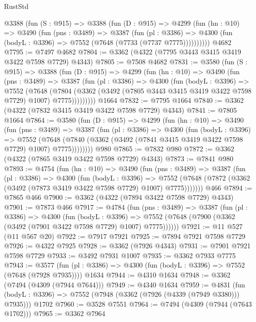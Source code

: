 \begin{lexlean}{RustStd}
\begin{coremodule}
    @3388
      (fun (S : @915) =>
      @3388
        (fun (D : @915) =>
        @4299
          (fun (hn : @10) =>
          @3490
            (fun (pns : @3489) =>
            @3387
              (fun (pl : @3386) =>
              @4300 (fun (bodyL : @3396) => @7552 (@7648 (@7733 (@7737 @7775))))))))))
    @4682
@7795 := @7497 @4682
@7804 := @3362 (@4322 (@7795 @3443 @3415 @3419 @3422 @7598 @7729) @4343)
@7805 := @7508 @4682
@7831 := @3580
    (fun (S : @915) =>
    @3388
      (fun (D : @915) =>
      @4299
        (fun (hn : @10) =>
        @3490
          (fun (pns : @3489) =>
          @3387
            (fun (pl : @3386) =>
            @4300
              (fun (bodyL : @3396) =>
              @7552
                (@7648
                  (@7804
                    (@3362 (@3492 (@7805 @3443 @3415 @3419 @3422 @7598 @7729) @1007) @7775)))))))))
    @1664
@7832 := @7795 @1664
@7840 := @3362 (@4322 (@7832 @3415 @3419 @3422 @7598 @7729) @4343)
@7841 := @7805 @1664
@7864 := @3580
    (fun (D : @915) =>
    @4299
      (fun (hn : @10) =>
      @3490
        (fun (pns : @3489) =>
        @3387
          (fun (pl : @3386) =>
          @4300
            (fun (bodyL : @3396) =>
            @7552
              (@7648 (@7840 (@3362 (@3492 (@7841 @3415 @3419 @3422 @7598 @7729) @1007) @7775))))))))
    @980
@7865 := @7832 @980
@7872 := @3362 (@4322 (@7865 @3419 @3422 @7598 @7729) @4343)
@7873 := @7841 @980
@7893 := @4754
    (fun (hn : @10) =>
    @3490
      (fun (pns : @3489) =>
      @3387
        (fun (pl : @3386) =>
        @4300
          (fun (bodyL : @3396) =>
          @7552 (@7648 (@7872 (@3362 (@3492 (@7873 @3419 @3422 @7598 @7729) @1007) @7775)))))))
    @466
@7894 := @7865 @466
@7900 := @3362 (@4322 (@7894 @3422 @7598 @7729) @4343)
@7901 := @7873 @466
@7917 := @4784
    (fun (pns : @3489) =>
    @3387
      (fun (pl : @3386) =>
      @4300
        (fun (bodyL : @3396) =>
        @7552 (@7648 (@7900 (@3362 (@3492 (@7901 @3422 @7598 @7729) @1007) @7775))))))
@7921 := @11 @527 (@11 @567 @20)
@7922 := @7917 @7921
@7925 := @7894 @7921 @7598 @7729
@7926 := @4322 @7925
@7928 := @3362 (@7926 @4343)
@7931 := @7901 @7921 @7598 @7729
@7933 := @3492 @7931 @1007
@7935 := @3362 @7933 @7775
@7943 := @3577
    (fun (pl : @3386) => @4300 (fun (bodyL : @3396) => @7552 (@7648 (@7928 @7935))))
    @1634
@7944 := @4310 @1634
@7948 := @3362 (@7494 (@4309 (@7944 @7644)))
@7949 := @4340 @1634
@7959 := @4831
    (fun (bodyL : @3396) => @7552 (@7948 (@3362 (@7926 (@4339 (@7949 @3380))) @7935)))
    @1702
@7960 := @3528 @7551
@7964 := @7494 (@4309 (@7944 (@7643 @1702)))
@7965 := @3362 @7964

\end{coremodule}
\end{lexlean}
